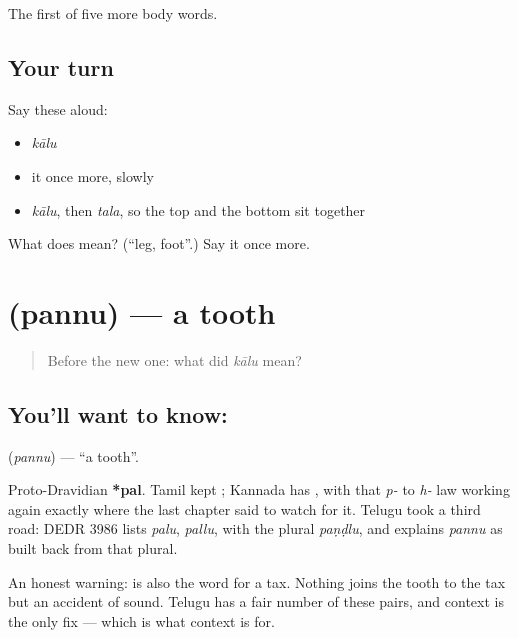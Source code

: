 \begin{grammarlens}[title={What you've built}]
The first of five more body words.
\end{grammarlens}

\subsection*{Your turn}
Say these aloud:

\begin{itemize}
\raggedright
  \item \emph{kālu}
  \item it once more, slowly
  \item \emph{kālu}, then \emph{tala}, so the top and the bottom sit together
\end{itemize}

\begin{tcolorbox}[breakable,colback=teal!4,colframe=teal!35!black,title={Before you move on}]
What does  mean? (\textquotedblleft{}leg, foot\textquotedblright{}.) Say it once more.
\end{tcolorbox}
\section[\texorpdfstring{\te{పన్ను} (pannu)}{పన్ను (pannu)}]{ (pannu) — a tooth}

\label{lesson:TE-C47-tooth}



\begin{quote}
Before the new one: what did \emph{kālu} mean?
\end{quote}

\subsection*{You'll want to know: }
\textbf{} (\emph{pannu}) — \textquotedblleft{}a tooth\textquotedblright{}.

Proto-Dravidian \textbf{*pal}. Tamil kept ; Kannada has , with that \emph{p-} to \emph{h-} law working again exactly where the last chapter said to watch for it. Telugu took a third road: DEDR 3986 lists \emph{palu}, \emph{pallu}, with the plural \emph{paṇḍlu}, and explains \emph{pannu} as built back from that plural.

An honest warning:  is also the word for a tax. Nothing joins the tooth to the tax but an accident of sound. Telugu has a fair number of these pairs, and context is the only fix — which is what context is for.


